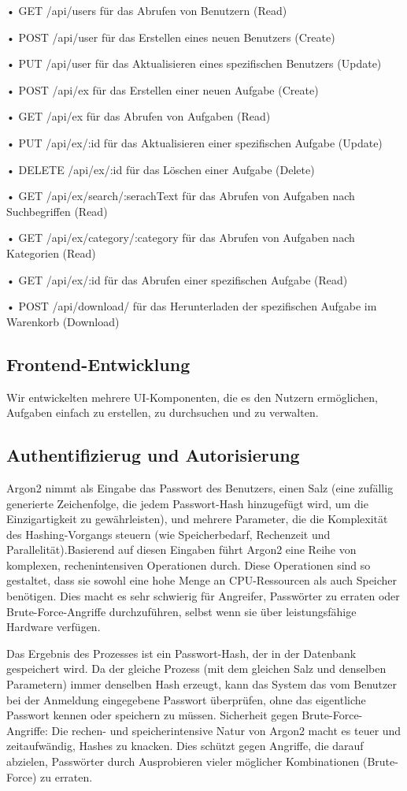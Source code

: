 \documentclass[12pt,a4paper]{scrartcl} %
\begin{document}
•	GET /api/users	für das Abrufen von Benutzern (Read)

•	POST /api/user	für das Erstellen eines neuen Benutzers (Create)

•	PUT /api/user	für das Aktualisieren eines spezifischen Benutzers (Update)

•	POST /api/ex	für das Erstellen einer neuen Aufgabe (Create)

•	GET /api/ex	für das Abrufen von Aufgaben (Read)

•	PUT /api/ex/:id	für das Aktualisieren einer spezifischen Aufgabe (Update)

•	DELETE /api/ex/:id 	für das Löschen einer Aufgabe (Delete)

•	GET /api/ex/search/:serachText	für das Abrufen von Aufgaben nach Suchbegriffen (Read)

•	GET /api/ex/category/:category	für das Abrufen von Aufgaben nach Kategorien (Read)

•	GET /api/ex/:id	für das Abrufen einer spezifischen Aufgabe (Read)

•	POST /api/download/ 	für das Herunterladen der spezifischen Aufgabe im Warenkorb (Download)


\subsection{Frontend-Entwicklung}
Wir entwickelten mehrere UI-Komponenten, die es den Nutzern ermöglichen, Aufgaben einfach zu erstellen, zu durchsuchen und zu verwalten.
\subsection{Authentifizierug und Autorisierung}
Argon2 nimmt als Eingabe das Passwort des Benutzers, einen Salz (eine zufällig generierte Zeichenfolge, die jedem Passwort-Hash hinzugefügt wird, um die Einzigartigkeit zu gewährleisten), und mehrere Parameter, die die Komplexität des Hashing-Vorgangs steuern (wie Speicherbedarf, Rechenzeit und Parallelität).Basierend auf diesen Eingaben führt Argon2 eine Reihe von komplexen, rechenintensiven Operationen durch. Diese Operationen sind so gestaltet, dass sie sowohl eine hohe Menge an CPU-Ressourcen als auch Speicher benötigen. Dies macht es sehr schwierig für Angreifer, Passwörter zu erraten oder Brute-Force-Angriffe durchzuführen, selbst wenn sie über leistungsfähige Hardware verfügen.

Das Ergebnis des Prozesses ist ein Passwort-Hash, der in der Datenbank gespeichert wird. Da der gleiche Prozess (mit dem gleichen Salz und denselben Parametern) immer denselben Hash erzeugt, kann das System das vom Benutzer bei der Anmeldung eingegebene Passwort überprüfen, ohne das eigentliche Passwort kennen oder speichern zu müssen. Sicherheit gegen Brute-Force-Angriffe: Die rechen- und speicherintensive Natur von Argon2 macht es teuer und zeitaufwändig, Hashes zu knacken. Dies schützt gegen Angriffe, die darauf abzielen, Passwörter durch Ausprobieren vieler möglicher Kombinationen (Brute-Force) zu erraten.
\end{document}

